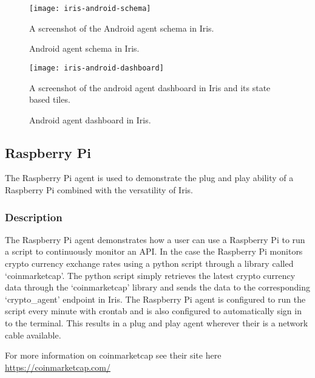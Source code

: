 \documentclass[12pt,a4paper,titlepage]{report}
\begin{document}
\begin{figure}[H]
\begin{tcolorbox}
\begin{center}
\texttt{[image: iris-android-schema]}
\end{center}
A screenshot of the Android agent schema in Iris.
\end{tcolorbox}
\caption{Android agent schema in Iris.}
\end{figure}

\begin{figure}[H]
\begin{tcolorbox}
\begin{center}
\texttt{[image: iris-android-dashboard]}
\end{center}
A screenshot of the android agent dashboard in Iris and its state based tiles.
\end{tcolorbox}
\caption{Android agent dashboard in Iris.}
\end{figure}

\subsection{Raspberry Pi}
The Raspberry Pi agent is used to demonstrate the plug and play ability of a Raspberry Pi combined with the versatility of Iris.

\subsubsection{Description}
The Raspberry Pi agent demonstrates how a user can use a Raspberry Pi to run a script to continuously monitor an API. In the case the Raspberry Pi monitors crypto currency exchange rates using a python script through a library called `coinmarketcap'. The python script simply retrieves the latest crypto currency data through the `coinmarketcap' library and sends the data to the corresponding `crypto\_agent' endpoint in Iris. The Raspberry Pi agent is configured to run the script every minute with crontab and is also configured to automatically sign in to the terminal. This results in a plug and play agent wherever their is a network cable available.

For more information on coinmarketcap see their site here \url{https://coinmarketcap.com/}
\end{document}
